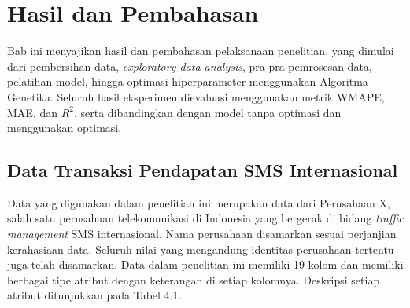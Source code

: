 \chapter{Hasil dan Pembahasan}\label{ch:result}

Bab ini menyajikan hasil dan pembahasan pelaksanaan penelitian, yang dimulai dari pembersihan data, \textit{exploratory data analysis}, pra-pra-pemrosesan data, pelatihan model, hingga optimasi hiperparameter menggunakan Algoritma Genetika. Seluruh hasil eksperimen dievaluasi menggunakan metrik WMAPE, MAE, dan $R^2$, serta dibandingkan dengan model tanpa optimasi dan menggunakan optimasi.

\section{Data Transaksi Pendapatan SMS Internasional}\label{sec:data}

    Data yang digunakan dalam penelitian ini merupakan data dari Perusahaan X, salah satu perusahaan telekomunikasi di Indonesia yang bergerak di bidang \textit{traffic management} SMS internasional. Nama perusahaan disamarkan sesuai perjanjian kerahasiaan data. Seluruh nilai yang mengandung identitas perusahaan tertentu juga telah disamarkan. Data dalam penelitian ini memiliki 19 kolom dan memiliki berbagai tipe atribut dengan keterangan di setiap kolomnya. Deskripsi setiap atribut ditunjukkan pada Tabel 4.1.

